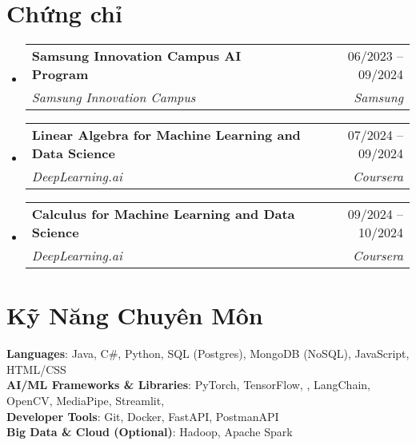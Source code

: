 \documentclass[letterpaper,11pt]{article}
\makeatletter
\newcommand{\resumeSubheading}[4]{
	\vspace{-2pt}\item
	\begin{tabular*}{0.97\textwidth}[t]{l@{\extracolsep{\fill}}r}
		\textbf{#1} & #2 \\
		\textit{\small#3} & \textit{\small #4} \\
	\end{tabular*}\vspace{-7pt}
}
\newcommand{\resumeSubHeadingListStart}{\begin{itemize}[leftmargin=0.15in, label={}]}
\newcommand{\resumeSubHeadingListEnd}{\end{itemize}}
\makeatother
\begin{document}
\section{Chứng chỉ}	
	\resumeSubHeadingListStart
		\resumeSubheading
			{Samsung Innovation Campus AI Program}{06/2023 -- 09/2024}
			{Samsung Innovation Campus}{Samsung}

		\resumeSubheading
			{Linear Algebra for Machine Learning and Data Science}{07/2024 -- 09/2024}
			{DeepLearning.ai}{Coursera}

		\resumeSubheading
			{Calculus for Machine Learning and Data Science} {09/2024 -- 10/2024}
			{DeepLearning.ai}{Coursera}
	\resumeSubHeadingListEnd

\section{Kỹ Năng Chuyên Môn}
\begin{itemize}[leftmargin=0.15in, label={}]
\small{\item{
	\textbf{Languages}{: Java, C\#, Python, SQL (Postgres), MongoDB (NoSQL), JavaScript, HTML/CSS} \\
	\textbf{AI/ML Frameworks \& Libraries}{: PyTorch, TensorFlow, , LangChain, OpenCV, MediaPipe, Streamlit, } \\
	\textbf{Developer Tools}{: Git, Docker, FastAPI, PostmanAPI} \\
	\textbf{Big Data \& Cloud (Optional)}{: Hadoop, Apache Spark}
}}
\end{itemize}
\end{document}
